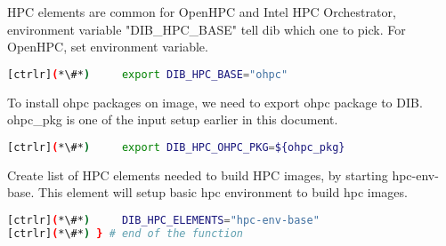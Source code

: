 	HPC elements are common for OpenHPC and Intel HPC Orchestrator, environment variable \newline
	"DIB\_HPC\_BASE" tell dib which one to pick. For OpenHPC, set environment variable.

\begin{lstlisting}[language=bash,keywords={}]
[ctrlr](*\#*)     export DIB_HPC_BASE="ohpc"
\end{lstlisting}

	To install ohpc packages on image, we need to export ohpc package to DIB.
         ohpc\_pkg is one of the input setup earlier in this document.

\begin{lstlisting}[language=bash,keywords={}]
[ctrlr](*\#*)     export DIB_HPC_OHPC_PKG=${ohpc_pkg}
\end{lstlisting}

	Create list of HPC elements needed to build HPC images, by starting hpc-env-base. This element will setup basic hpc environment to build hpc images.

\begin{lstlisting}[language=bash,keywords={}]
[ctrlr](*\#*)     DIB_HPC_ELEMENTS="hpc-env-base"
[ctrlr](*\#*) } # end of the function
\end{lstlisting}
